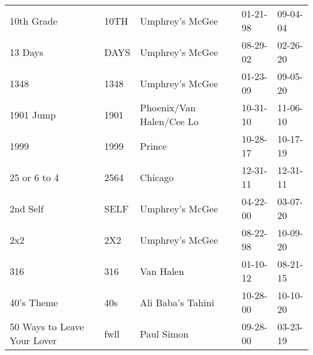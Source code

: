 \begin{longtable}{p{}p{}p{}p{}p{}}
                                                              10th Grade &          10TH &                                          Umphrey's McGee &              01-21-98 &             09-04-04 \\
                                                                 13 Days &          DAYS &                                          Umphrey's McGee &              08-29-02 &             02-26-20 \\
                                                                    1348 &          1348 &                                          Umphrey's McGee &              01-23-09 &             09-05-20 \\
                                                               1901 Jump &          1901 &                                 Phoenix/Van Halen/Cee Lo &              10-31-10 &             11-06-10 \\
                                                                    1999 &          1999 &                                                   Prince &              10-28-17 &             10-17-19 \\
                                                            25 or 6 to 4 &          2564 &                                                  Chicago &              12-31-11 &             12-31-11 \\
                                                                2nd Self &          SELF &                                          Umphrey's McGee &              04-22-00 &             03-07-20 \\
                                                                     2x2 &           2X2 &                                          Umphrey's McGee &              08-22-98 &             10-09-20 \\
                                                                     316 &           316 &                                                Van Halen &              01-10-12 &             08-21-15 \\
                                                              40's Theme &           40s &                                        Ali Baba's Tahini &              10-28-00 &             10-10-20 \\
                                             50 Ways to Leave Your Lover &          fwll &                                               Paul Simon &              09-28-00 &             03-23-19 \\

\end{longtable}

